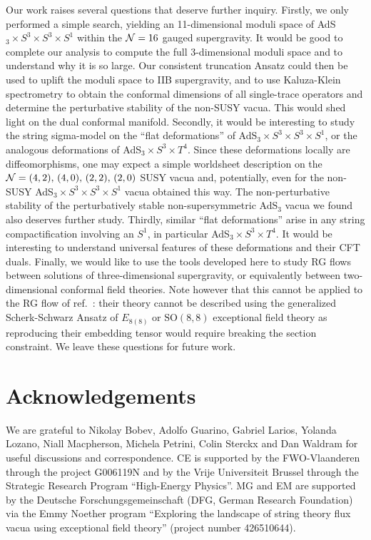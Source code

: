 \documentclass[a4paper, 11pt]{article}
\numberwithin{equation}{section}
\newcommand{\SO}[1]{\mathrm{SO}( #1 )}
\newcommand{\EE}{\ensuremath{E_{8(8)}}\xspace}
\newcommand{\+}{\oplus}
\begin{document}
Our work raises several questions that deserve further inquiry. Firstly, we only performed a simple search, yielding an 11-dimensional moduli space of AdS$_3 \times S^3 \times S^3 \times S^1$ within the ${\cal N}=16$ gauged supergravity. It would be good to complete our analysis to compute the full 3-dimensional moduli space and to understand why it is so large. Our consistent truncation Ansatz could then be used to uplift the moduli space to IIB supergravity, and to use Kaluza-Klein spectrometry \cite{Malek:2019eaz,Malek:2020yue,Eloy:2020uix} to obtain the conformal dimensions of all single-trace operators and determine the perturbative stability of the non-SUSY vacua. This would shed light on the dual conformal manifold. Secondly, it would be interesting to study the string sigma-model \cite{Eberhardt:2019niq} on the ``flat deformations'' of AdS$_3 \times S^3 \times S^3 \times S^1$, or the analogous deformations of AdS$_3 \times S^3 \times T^4$. Since these deformations locally are diffeomorphisms, one may expect a simple worldsheet description on the ${\cal N}=(4,2),\, (4,0),\, (2,2),\, (2,0)$ SUSY vacua and, potentially, even for the non-SUSY AdS$_3 \times S^3 \times S^3 \times S^1$ vacua obtained this way. The non-perturbative stability of the perturbatively stable non-supersymmetric AdS$_3$ vacua we found also deserves further study. Thirdly, similar ``flat deformations'' arise in any string compactification involving an $S^1$, in particular AdS$_3 \times S^3 \times T^4$. It would be interesting to understand universal features of these deformations and their CFT duals. Finally, we would like to use the tools developed here to study RG flows between solutions of three-dimensional supergravity, or equivalently between two-dimensional conformal field theories. Note however that this cannot be applied to the RG flow of ref.~\cite{Berg:2001ty}: their theory cannot be described using the generalized Scherk-Schwarz Ansatz of \EE or $\SO{8,8}$ exceptional field theory as reproducing their embedding tensor would require breaking the section constraint. We leave these questions for future work.

\section*{Acknowledgements}
We are grateful to Nikolay Bobev, Adolfo Guarino, Gabriel Larios, Yolanda Lozano, Niall Macpherson, Michela Petrini, Colin Sterckx and Dan Waldram for useful discussions and correspondence. CE is supported by the FWO-Vlaanderen through the project G006119N and by the Vrije Universiteit Brussel through the Strategic Research Program ``High-Energy Physics''. MG and EM are supported by the Deutsche Forschungsgemeinschaft (DFG, German Research Foundation) via the Emmy Noether program ``Exploring the landscape of string theory flux vacua using exceptional field theory'' (project number 426510644).
\end{document}
